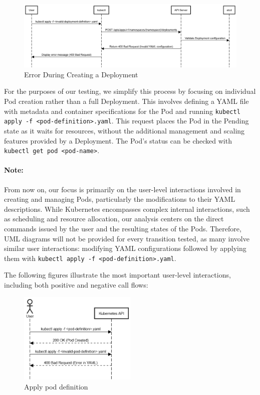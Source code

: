 \documentclass[main.tex]{subfiles}
\begin{document}
\begin{figure}[H]
    \centering
    \includegraphics[width=\textwidth]{../uml_seq_diagrams/error_creating.png}
    \caption{Error During Creating a Deployment}
    \label{fig:create_deployment_diagram}
\end{figure}

For the purposes of our testing, we simplify this process by focusing on individual Pod creation rather than a full Deployment. This involves defining a YAML file with metadata and container specifications for the Pod and running \texttt{kubectl apply -f <pod-definition>.yaml}. This request places the Pod in the Pending state as it waits for resources, without the additional management and scaling features provided by a Deployment. The Pod's status can be checked with \texttt{kubectl get pod <pod-name>}.

\paragraph{Note:} From now on, our focus is primarily on the user-level interactions involved in creating and managing Pods, particularly the modifications to their YAML descriptions. While Kubernetes encompasses complex internal interactions, such as scheduling and resource allocation, our analysis centers on the direct commands issued by the user and the resulting states of the Pods. Therefore, UML diagrams will not be provided for every transition tested, as many involve similar user interactions: modifying YAML configurations followed by applying them with \texttt{kubectl apply -f <pod-definition>.yaml}. 

The following figures illustrate the most important user-level interactions, including both positive and negative call flows:
    
\begin{figure}[H]
    \centering
    \includegraphics[width=0.5\textwidth]{../uml_seq_diagrams/kubectl_apply.png}
    \caption{Apply pod definition}
    \label{fig:apply_pod_def_diagram}
\end{figure}
\end{document}
